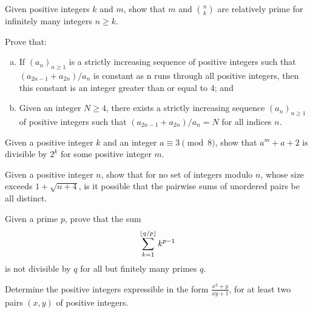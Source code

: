\begin{problem}
	Given positive integers $k$ and $m$, show that $m$ and $\binom{n}{k}$ are relatively prime for infinitely many integers $n \geq k$.
\end{problem}

\begin{problem}
	Prove that:
	\begin{enumerate}[(a)]
		\item If $(a_n)_{n\geq 1}$ is a strictly increasing sequence of positive integers such that $(a_{2n-1}+a_{2n})/a_n$ is constant as n runs through all positive integers, then this constant is an integer greater than or equal to $4$; and
		\item Given an integer $N \geq 4$, there exists a strictly increasing sequence $(a_n)_{n\geq 1}$ of positive integers such that $(a_{2n-1}+a_{2n})/a_n=N$ for all indices $n$.
	\end{enumerate}
\end{problem}

\begin{problem}
	Given a positive integer $k$ and an integer $a \equiv 3 \pmod 8$, show that $a^m + a + 2$ is divisible by $2^k$ for some positive integer $m$.
\end{problem}

\begin{problem}
	Given a positive integer $n$, show that for no set of integers modulo $n$, whose size exceeds $1 + \sqrt{n + 4}$, is it possible that the pairwise sums of unordered pairs be all distinct.
\end{problem}

\begin{problem}
	Given a prime $p$, prove that the sum
		\begin{align*}
			\sum\limits_{k=1}^{\left\lfloor{q/p}\right\rfloor}{k^{p-1}}
		\end{align*}
	is not divisible by $q$ for all but finitely many primes $q$. %
\end{problem}

\begin{problem}
	Determine the positive integers expressible in the form $\frac{x^2+y}{xy+1}$, for at least two pairs $(x,y)$ of positive integers. %
\end{problem}


